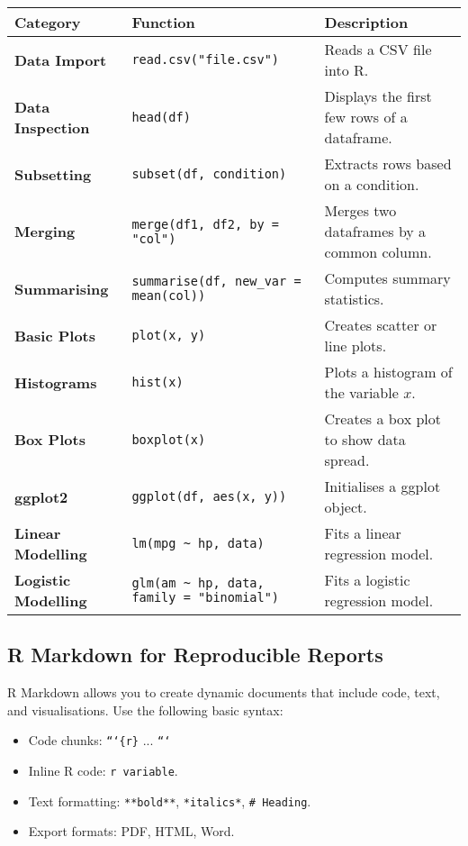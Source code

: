\begin{tabularx}{\textwidth}{|l|X|X|}
\hline
\textbf{Category} & \textbf{Function} & \textbf{Description} \\
\hline
\textbf{Data Import} & \texttt{read.csv("file.csv")} & Reads a CSV file into R. \\
\hline
\textbf{Data Inspection} & \texttt{head(df)} & Displays the first few rows of a dataframe. \\
\hline
\textbf{Subsetting} & \texttt{subset(df, condition)} & Extracts rows based on a condition. \\
\hline
\textbf{Merging} & \texttt{merge(df1, df2, by = "col")} & Merges two dataframes by a common column. \\
\hline
\textbf{Summarising} & \texttt{summarise(df, new\_var = mean(col))} & Computes summary statistics. \\
\hline
\textbf{Basic Plots} & \texttt{plot(x, y)} & Creates scatter or line plots. \\
\hline
\textbf{Histograms} & \texttt{hist(x)} & Plots a histogram of the variable \( x \). \\
\hline
\textbf{Box Plots} & \texttt{boxplot(x)} & Creates a box plot to show data spread. \\
\hline
\textbf{ggplot2} & \texttt{ggplot(df, aes(x, y))} & Initialises a ggplot object. \\
\hline
\textbf{Linear Modelling} & \texttt{lm(mpg \textasciitilde{} hp, data)} & Fits a linear regression model. \\
\hline
\textbf{Logistic Modelling} & \texttt{glm(am \textasciitilde{} hp, data, family = "binomial")} & Fits a logistic regression model. \\
\hline
\end{tabularx}

\subsection{R Markdown for Reproducible Reports}
R Markdown allows you to create dynamic documents that include code, text, and visualisations. Use the following basic syntax:

\begin{itemize}
    \item Code chunks: \texttt{```\{r\}} ... \texttt{```}
    \item Inline R code: \texttt{\textasciigrave{}r variable\textasciigrave{}}.
    \item Text formatting: \texttt{**bold**}, \texttt{*italics*}, \texttt{\# Heading}.
    \item Export formats: PDF, HTML, Word.
\end{itemize}

